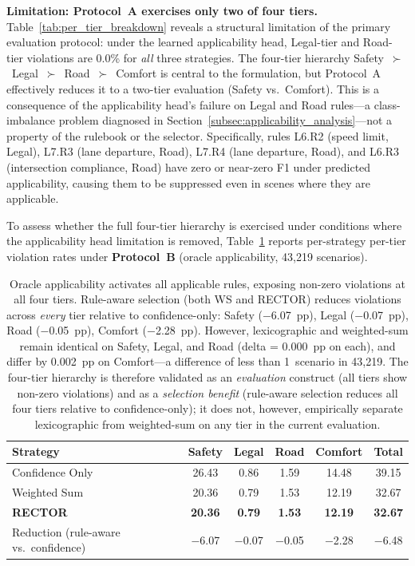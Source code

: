 \noindent\textbf{Limitation: Protocol~A exercises only two of four tiers.}
Table~\ref{tab:per_tier_breakdown} reveals a structural limitation of the primary evaluation protocol: under the learned applicability head, Legal-tier and Road-tier violations are 0.0\% for \emph{all} three strategies.  The four-tier hierarchy Safety~$\succ$~Legal~$\succ$~Road~$\succ$~Comfort is central to the formulation, but Protocol~A effectively reduces it to a two-tier evaluation (Safety vs.\ Comfort).  This is a consequence of the applicability head's failure on Legal and Road rules---a class-imbalance problem diagnosed in Section~\ref{subsec:applicability_analysis}---not a property of the rulebook or the selector.  Specifically, rules L6.R2 (speed limit, Legal), L7.R3 (lane departure, Road), L7.R4 (lane departure, Road), and L6.R3 (intersection compliance, Road) have zero or near-zero F1 under predicted applicability, causing them to be suppressed even in scenes where they are applicable.

To assess whether the full four-tier hierarchy is exercised under conditions where the applicability head limitation is removed, Table~\ref{tab:per_tier_oracle} reports per-strategy per-tier violation rates under \textbf{Protocol~B} (oracle applicability, 43{,}219 scenarios).

\begin{table}[t]
\centering
\caption{Per-Tier Violation Rates by Selection Strategy (\%, Protocol~B, Oracle Applicability, 43{,}219 Scenarios)}
\label{tab:per_tier_oracle}
\setlength{\tabcolsep}{3pt}
\begin{tabular}{lccccc}
\toprule
\textbf{Strategy} & \textbf{Safety} & \textbf{Legal} & \textbf{Road} & \textbf{Comfort} & \textbf{Total} \\
\midrule
Confidence Only & 26.43 & 0.86 & 1.59 & 14.48 & 39.15 \\
Weighted Sum    & 20.36 & 0.79 & 1.53 & 12.19 & 32.67 \\
\textbf{RECTOR} & \textbf{20.36} & \textbf{0.79} & \textbf{1.53} & \textbf{12.19} & \textbf{32.67} \\
\midrule
Reduction (rule-aware vs.\ confidence) & $-$6.07 & $-$0.07 & $-$0.05 & $-$2.28 & $-$6.48 \\
\bottomrule
\end{tabular}
\vspace{1mm}
\caption*{\footnotesize Oracle applicability activates all applicable rules, exposing non-zero violations at all four tiers.  Rule-aware selection (both WS and RECTOR) reduces violations across \emph{every} tier relative to confidence-only: Safety ($-$6.07~pp), Legal ($-$0.07~pp), Road ($-$0.05~pp), Comfort ($-$2.28~pp).  However, lexicographic and weighted-sum remain identical on Safety, Legal, and Road (delta = 0.000~pp on each), and differ by 0.002~pp on Comfort---a difference of less than 1~scenario in 43{,}219.  The four-tier hierarchy is therefore validated as an \emph{evaluation} construct (all tiers show non-zero violations) and as a \emph{selection benefit} (rule-aware selection reduces all four tiers relative to confidence-only); it does not, however, empirically separate lexicographic from weighted-sum on any tier in the current evaluation.}
\end{table}

